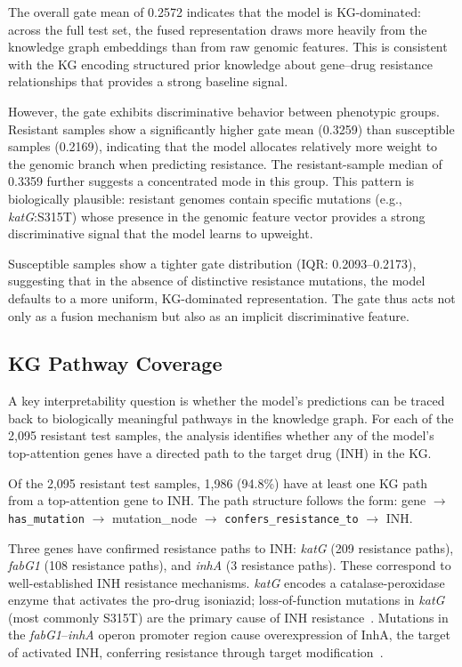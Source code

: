 \documentclass[conference]{IEEEtran}
\begin{document}
The overall gate mean of 0.2572 indicates that the model is KG-dominated: across the full test set, the fused representation draws more heavily from the knowledge graph embeddings than from raw genomic features. This is consistent with the KG encoding structured prior knowledge about gene--drug resistance relationships that provides a strong baseline signal.

However, the gate exhibits discriminative behavior between phenotypic groups. Resistant samples show a significantly higher gate mean (0.3259) than susceptible samples (0.2169), indicating that the model allocates relatively more weight to the genomic branch when predicting resistance. The resistant-sample median of 0.3359 further suggests a concentrated mode in this group. This pattern is biologically plausible: resistant genomes contain specific mutations (e.g., \textit{katG}:S315T) whose presence in the genomic feature vector provides a strong discriminative signal that the model learns to upweight.

Susceptible samples show a tighter gate distribution (IQR: 0.2093--0.2173), suggesting that in the absence of distinctive resistance mutations, the model defaults to a more uniform, KG-dominated representation. The gate thus acts not only as a fusion mechanism but also as an implicit discriminative feature.

\subsection{KG Pathway Coverage}

A key interpretability question is whether the model's predictions can be traced back to biologically meaningful pathways in the knowledge graph. For each of the 2{,}095 resistant test samples, the analysis identifies whether any of the model's top-attention genes have a directed path to the target drug (INH) in the KG.

Of the 2{,}095 resistant test samples, 1{,}986 (94.8\%) have at least one KG path from a top-attention gene to INH. The path structure follows the form: gene $\rightarrow$ \texttt{has\_mutation} $\rightarrow$ mutation\_node $\rightarrow$ \texttt{confers\_resistance\_to} $\rightarrow$ INH.

Three genes have confirmed resistance paths to INH: \textit{katG} (209 resistance paths), \textit{fabG1} (108 resistance paths), and \textit{inhA} (3 resistance paths). These correspond to well-established INH resistance mechanisms. \textit{katG} encodes a catalase-peroxidase enzyme that activates the pro-drug isoniazid; loss-of-function mutations in \textit{katG} (most commonly S315T) are the primary cause of INH resistance~\cite{ref_katg}. Mutations in the \textit{fabG1}--\textit{inhA} operon promoter region cause overexpression of InhA, the target of activated INH, conferring resistance through target modification~\cite{ref_inha}.
\end{document}
